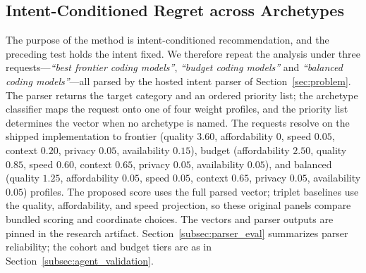 \documentclass[pdflatex,sn-mathphys-num]{sn-jnl}
\theoremstyle{thmstyleone}
\theoremstyle{thmstylethree}
\begin{document}
\subsection{Intent-Conditioned Regret across Archetypes}\label{subsec:archetype_regret}

The purpose of the method is intent-conditioned recommendation, and the preceding test holds the intent fixed. We therefore repeat the analysis under three requests---\emph{``best frontier coding models''}, \emph{``budget coding models''} and \emph{``balanced coding models''}---all parsed by the hosted intent parser of Section~\ref{sec:problem}. The parser returns the target category and an ordered priority list; the archetype classifier maps the request onto one of four weight profiles, and the priority list determines the vector when no archetype is named. The requests resolve on the shipped implementation to frontier (quality $3.60$, affordability $0$, speed $0.05$, context $0.20$, privacy $0.05$, availability $0.15$), budget (affordability $2.50$, quality $0.85$, speed $0.60$, context $0.65$, privacy $0.05$, availability $0.05$), and balanced (quality $1.25$, affordability $0.05$, speed $0.05$, context $0.65$, privacy $0.05$, availability $0.05$) profiles. The proposed score uses the full parsed vector; triplet baselines use the quality, affordability, and speed projection, so these original panels compare bundled scoring and coordinate choices. The vectors and parser outputs are pinned in the research artifact. Section~\ref{subsec:parser_eval} summarizes parser reliability; the cohort and budget tiers are as in Section~\ref{subsec:agent_validation}.
\end{document}
